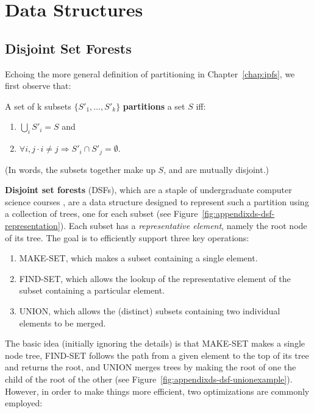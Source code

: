 \chapter{Data Structures}
\label{chap:appendixds}

\section{Disjoint Set Forests}
\label{sec:appendixds-dsf}

Echoing the more general definition of partitioning in Chapter~\ref{chap:ipfs}, we first observe that:

\begin{definition}
A set of k subsets $\{S'_1,\ldots,S'_k\}$ \textbf{partitions} a set $S$ iff:

\begin{enumerate}
\item $\bigcup_i S'_i = S$ and
\item $\forall i,j \cdot i \ne j \Rightarrow S'_i \cap S'_j = \emptyset$.
\end{enumerate}

\noindent (In words, the subsets together make up $S$, and are mutually disjoint.)
\end{definition}

\noindent \textbf{Disjoint set forests} (DSFs), which are a staple of undergraduate computer science courses \cite{worrell06}, are a data structure designed to represent such a partition using a collection of trees, one for each subset (see Figure~\ref{fig:appendixds-dsf-representation}). Each subset has a \emph{representative element}, namely the root node of its tree. The goal is to efficiently support three key operations:


\begin{enumerate}

\item MAKE-SET, which makes a subset containing a single element.
\item FIND-SET, which allows the lookup of the representative element of the subset containing a particular element.
\item UNION, which allows the (distinct) subsets containing two individual elements to be merged.

\end{enumerate}
%
The basic idea (initially ignoring the details) is that MAKE-SET makes a single node tree, FIND-SET follows the path from a given element to the top of its tree and returns the root, and UNION merges trees by making the root of one the child of the root of the other (see Figure~\ref{fig:appendixds-dsf-unionexample}). However, in order to make things more efficient, two optimizations are commonly employed:

